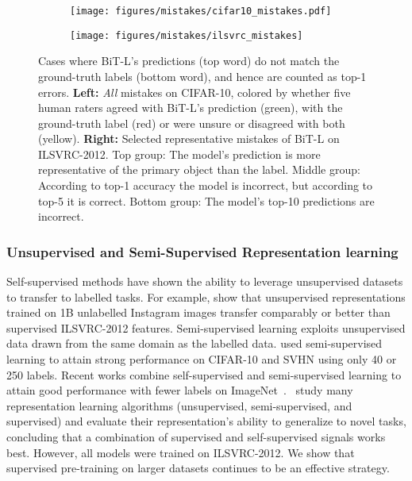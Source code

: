 \documentclass[runningheads]{llncs}
\newcommand{\name}{{BiT}}
\newcommand{\imagenet}{{ILSVRC-2012}}
\begin{document}
\begin{figure}[t]
\centering
\begin{subfigure}[b]{0.66\textwidth}
  \centering
  \texttt{[image: figures/mistakes/cifar10\_mistakes.pdf]}
\end{subfigure}
\hfill
\begin{subfigure}[b]{0.29\textwidth}
 \centering
 \texttt{[image: figures/mistakes/ilsvrc\_mistakes]}
\end{subfigure}
\caption{
Cases where \name{}-L's predictions (top word) do not match the ground-truth labels (bottom word), and hence are counted as top-1 errors. 
\textbf{Left:} 
\emph{All} mistakes on CIFAR-10, colored by whether five human raters agreed with \name{}-L's prediction (green), with the ground-truth label (red) or were unsure or disagreed with both (yellow).
\textbf{Right:} 
Selected representative mistakes of \name{}-L on \imagenet{}.
Top group: The model's prediction is more representative of the primary object than the label.
Middle group: According to top-1 accuracy the model is incorrect, but according to top-5 it is correct.
Bottom group: The model's top-10 predictions are incorrect.}\label{fig:mistakes}\vspace{-10pt}
\end{figure}


\vspace{-2mm}

\subsubsection{Unsupervised and Semi-Supervised Representation learning}
Self-su\-per\-vi\-sed methods have shown the ability to leverage unsupervised datasets to transfer to labelled tasks.
For example, \cite{he2019momentum} show that unsupervised representations trained on 1B unlabelled Instagram images transfer comparably or better than supervised \imagenet{} features.
Semi-supervised learning exploits unsupervised data drawn from the same domain as the labelled data.
\cite{berthelot2019remixmatch,sohn2020fixmatch} used semi-supervised learning to attain strong performance on CIFAR-10 and SVHN using only 40 or 250 labels.
Recent works combine self-supervised and semi-supervised learning to attain good performance with fewer labels on ImageNet~\cite{zhai2019s4l,henaff2019data}.
\cite{zhai2019visual}~study many representation learning algorithms (unsupervised, semi-su\-per\-vi\-sed, and supervised) and evaluate their representation's ability to generalize to novel tasks, concluding that a combination of supervised and self-supervised signals works best. 
However, all models were trained on \imagenet{}.
We show that supervised pre-training on larger datasets continues to be an effective strategy.
\end{document}
